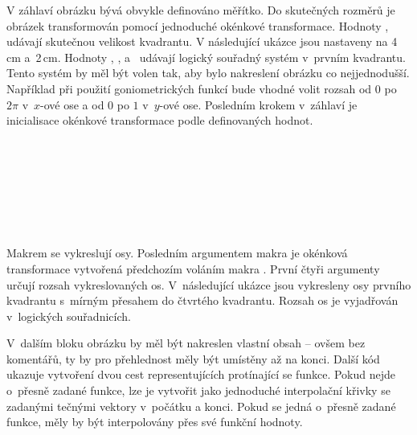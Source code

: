 \documentclass[12pt]{article}
\begin{document}
\medskip
V záhlaví obrázku bývá obvykle definováno měřítko.
Do skutečných rozměrů je obrázek transformován pomocí jednoduché okénkové
transformace. Hodnoty ,  udávají skutečnou velikost kvadrantu.
V následující ukázce jsou nastaveny na \mbox{4\,cm} a~2\,cm.
Hodnoty , ,  a~ udávají logický souřadný systém
v~prvním kvadrantu. Tento systém by měl být volen tak, 
aby bylo nakreslení obrázku co nejjednodušší. Například při použití
goniometrických funkcí bude vhodné volit rozsah od $0$ po $2\pi$ 
v~$x$-ové ose a od $0$ po $1$ v~$y$-ové ose.
Posledním krokem v~záhlaví je inicialisace okénkové transformace podle
definovaných hodnot.

\begin{flushleft}
   \\
   \\
   \\
   \\
   \\[4pt]
   \\
\end{flushleft}

Makrem  se vykreslují osy. Posledním argumentem
makra je okénková transformace vytvořená předchozím voláním makra 
. 
První čtyři argumenty určují rozsah vykreslovaných os.
V~následující ukázce jsou vykresleny osy prvního
kvadrantu s~mírným přesahem do čtvrtého kvadrantu.
Rozsah os je vyjadřován v~logických souřadnicích.

\begin{flushleft}
\end{flushleft}

V~dalším bloku obrázku by měl být nakreslen vlastní obsah -- ovšem bez
komentářů, ty by pro přehlednost měly být umístěny až na konci. Další kód
ukazuje vytvoření dvou cest representujících protínající se funkce. Pokud
nejde o~přesně zadané funkce, lze je vytvořit jako jednoduché interpolační
křivky se zadanými tečnými vektory v~počátku a konci. Pokud se jedná
o~přesně zadané funkce, měly by být interpolovány přes své funkční hodnoty.

\begin{flushleft}
   \\
   \\
   \\[4pt]
   \\
\end{flushleft}
\end{document}
